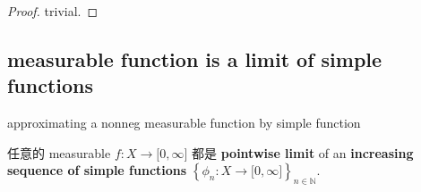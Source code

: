 \documentclass{qlnotes-export}
\begin{document}
\begin{proof}

trivial.

\end{proof}

\subsection{measurable function is a limit of simple functions}\label{measurable-function-is-a-limit-of-simple-functions}

\begin{theorem}{approximating a nonneg measurable function by simple function}\label{thm-04-measurable-functions-and-integration-on-l-mu-approximating-a-nonneg-measurable-function-by-simple-function}

任意的 measurable \(f:X\rightarrow\lbrack 0,\infty\rbrack\) 都是 \textbf{pointwise limit} of an \textbf{increasing sequence of simple functions} \(\left\{ {\phi_{n}:X\rightarrow\lbrack 0,\infty\rbrack} \right\}_{n \in {\mathbb{N}}}\).

\end{theorem}
\end{document}
